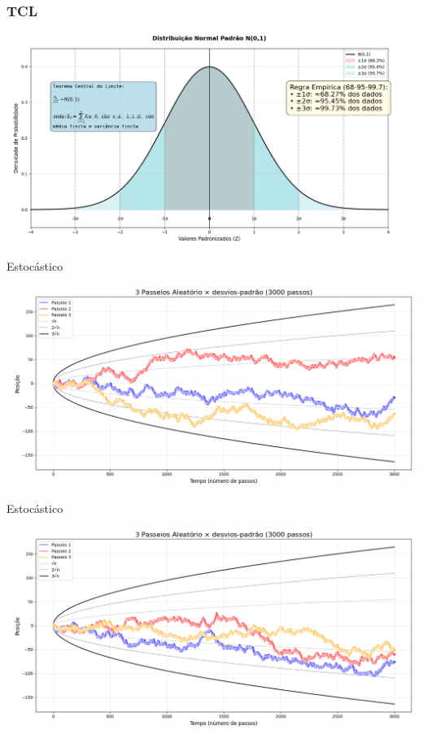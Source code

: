 \documentclass{beamer}
\begin{document}
\begin{frame}
  \frametitle{TCL}
  \includegraphics[width=\textwidth]{tcl.png}

\end{frame}
\begin{frame}{Estocástico}

\includegraphics[width=\textwidth]{srw2.png}

\end{frame}

\begin{frame}{Estocástico}

\includegraphics[width=\textwidth]{srw3.png}

\end{frame}
\end{document}
